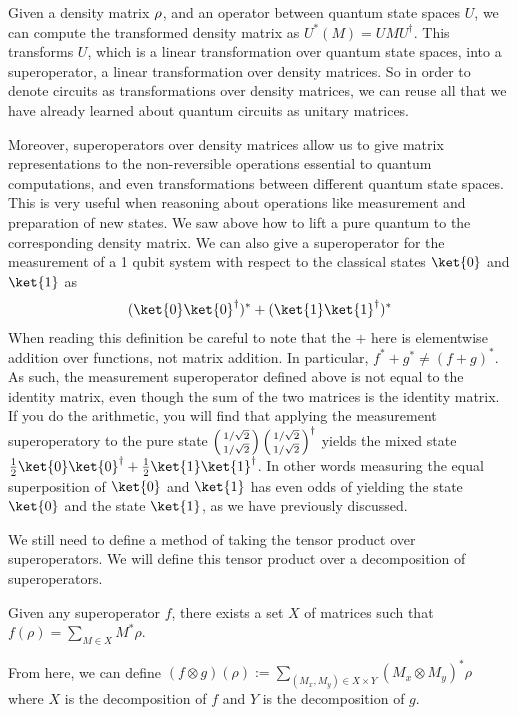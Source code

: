 Given a density matrix $\rho$, and an operator between quantum state spaces $U$, we can compute the transformed density matrix as $U^*(M)=UMU^\dagger$.
This transforms $U$, which is a linear transformation over quantum state spaces, into a superoperator, a linear transformation over density matrices.
So in order to denote circuits as transformations over density matrices, we can reuse all that we have already learned about quantum circuits as unitary matrices.


Moreover, superoperators over density matrices allow us to give matrix representations to the non-reversible operations essential to quantum computations, and even transformations between different quantum state spaces.
This is very useful when reasoning about operations like measurement and preparation of new states.
We saw above how to lift a pure quantum to the corresponding density matrix.
We can also give a superoperator for the measurement of a 1 qubit system with respect to the classical states $\ket{0}$ and $\ket{1}$ as
\begin{align*}
    (\ket{0}\ket{0}^\dagger )^* + (\ket{1}\ket{1}^\dagger )^*
\end{align*}
When reading this definition be careful to note that the $+$ here is elementwise addition over functions, not matrix addition.
In particular, $f^* + g^* \neq (f+g)^*$.
As such, the measurement superoperator defined above is not equal to the identity matrix, even though the sum of the two matrices is the identity matrix.
If you do the arithmetic, you will find that applying the measurement superoperatory to the pure state $\left(\begin{smallmatrix}1/\sqrt{2} \\ 1/\sqrt{2}\end{smallmatrix}\right)\left(\begin{smallmatrix}1/\sqrt{2} \\ 1/\sqrt{2}\end{smallmatrix}\right)^\dagger$ yields the mixed state $\frac{1}{2}\ket{0}\ket{0}^\dagger + \frac{1}{2}\ket{1}\ket{1}^\dagger$.
In other words measuring the equal superposition of $\ket{0}$ and $\ket{1}$ has even odds of yielding the state $\ket{0}$ and the state $\ket{1}$, as we have previously discussed.

We still need to define a method of taking the tensor product over superoperators.
We will define this tensor product over a decomposition of superoperators.
\begin{lemma}
    Given any superoperator $f$, there exists a set $X$ of matrices such that $f(\rho)=\sum_{M\in X}M^*\rho$.
\end{lemma}
From here, we can define $(f \otimes g) (\rho) := \sum_{(M_x, M_y) \in X \times Y}(M_x \otimes M_y)^*\rho$ where $X$ is the decomposition of $f$ and $Y$ is the decomposition of $g$.